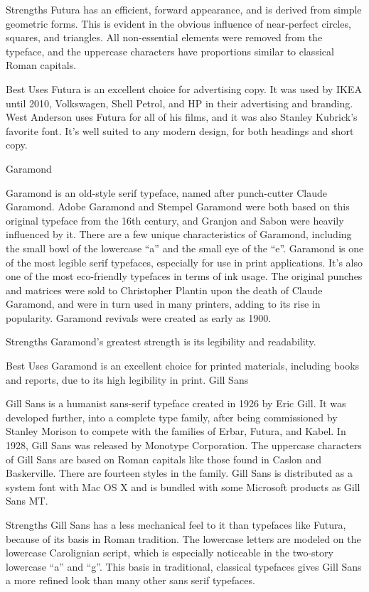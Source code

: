 \documentclass[12pt,a4paper,twocolumn]{book} %
\begin{document}
Strengths
Futura has an efficient, forward appearance, and is derived from simple geometric forms. This is evident in the obvious influence of near-perfect circles, squares, and triangles. All non-essential elements were removed from the typeface, and the uppercase characters have proportions similar to classical Roman capitals.

Best Uses
Futura is an excellent choice for advertising copy. It was used by IKEA until 2010, Volkswagen, Shell Petrol, and HP in their advertising and branding. West Anderson uses Futura for all of his films, and it was also Stanley Kubrick’s favorite font. It’s well suited to any modern design, for both headings and short copy.


Garamond

Garamond is an old-style serif typeface, named after punch-cutter Claude Garamond. Adobe Garamond and Stempel Garamond were both based on this original typeface from the 16th century, and Granjon and Sabon were heavily influenced by it. There are a few unique characteristics of Garamond, including the small bowl of the lowercase “a” and the small eye of the “e”.
Garamond is one of the most legible serif typefaces, especially for use in print applications. It’s also one of the most eco-friendly typefaces in terms of ink usage. The original punches and matrices were sold to Christopher Plantin upon the death of Claude Garamond, and were in turn used in many printers, adding to its rise in popularity. Garamond revivals were created as early as 1900.

Strengths
Garamond’s greatest strength is its legibility and readability.

Best Uses
Garamond is an excellent choice for printed materials, including books and reports, due to its high legibility in print.
Gill Sans

Gill Sans is a humanist sans-serif typeface created in 1926 by Eric Gill. It was developed further, into a complete type family, after being commissioned by Stanley Morison to compete with the families of Erbar, Futura, and Kabel. In 1928, Gill Sans was released by Monotype Corporation.
The uppercase characters of Gill Sans are based on Roman capitals like those found in Caslon and Baskerville. There are fourteen styles in the family. Gill Sans is distributed as a system font with Mac OS X and is bundled with some Microsoft products as Gill Sans MT.

Strengths
Gill Sans has a less mechanical feel to it than typefaces like Futura, because of its basis in Roman tradition. The lowercase letters are modeled on the lowercase Carolignian script, which is especially noticeable in the two-story lowercase “a” and “g”. This basis in traditional, classical typefaces gives Gill Sans a more refined look than many other sans serif typefaces.
\end{document}

